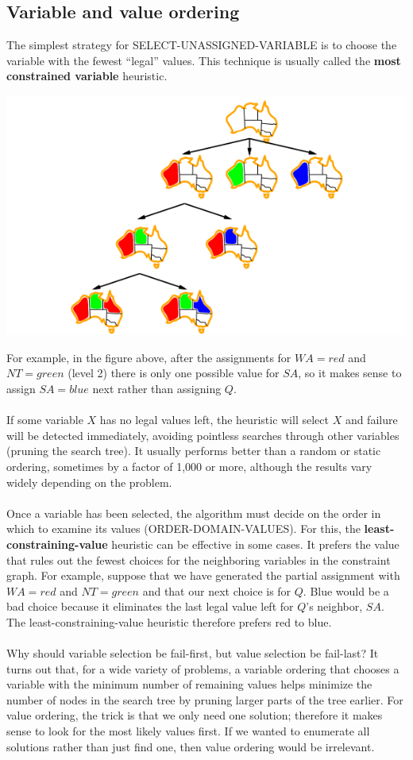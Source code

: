 \subsection{Variable and value ordering}
The simplest strategy for SELECT-UNASSIGNED-VARIABLE is to choose the variable with the fewest “legal” values. This technique is usually  called the \textbf{most constrained variable} heuristic.
\begin{center}
    \includegraphics[scale=0.9]{images/CSP-MCV.png}
\end{center}
For example, in the figure above,  after the assignments for $WA = red$ and $NT = green$ (level 2) there is only one possible value for $SA$, so it makes sense to assign $SA = blue$ next rather than assigning $Q$.
\\\\
If some variable $X$ has no legal values left, the heuristic  will select $X$ and failure will be detected immediately, avoiding pointless searches through other variables (pruning the search tree). It usually performs better than a random or static ordering, sometimes by a factor of 1,000 or more, although the results vary widely depending on the problem.
\\\\
Once a variable has been selected, the algorithm must decide on the order in which to examine its values (ORDER-DOMAIN-VALUES). For this, the \textbf{least-constraining-value} heuristic can be effective in some cases.  It prefers the value that rules out the fewest choices for the neighboring variables in the constraint graph. For example, suppose that we have generated the partial assignment with $WA = red$ and $NT = green$ and that our next choice is for $Q$. Blue would
be a bad choice because it eliminates the last legal value left for $Q$’s neighbor, $SA$. The least-constraining-value heuristic therefore prefers red to blue.\\\\
Why should variable selection be fail-first, but value selection be fail-last?  It turns out that, for a wide variety of problems, a variable ordering that chooses a variable with the minimum number of remaining values helps minimize the number of nodes in the search tree by pruning larger parts of the tree earlier. For value ordering, the trick is that we only need one solution; therefore it makes sense to look for the most likely values first. If we wanted to enumerate all solutions rather than just find one, then value ordering would be irrelevant.

